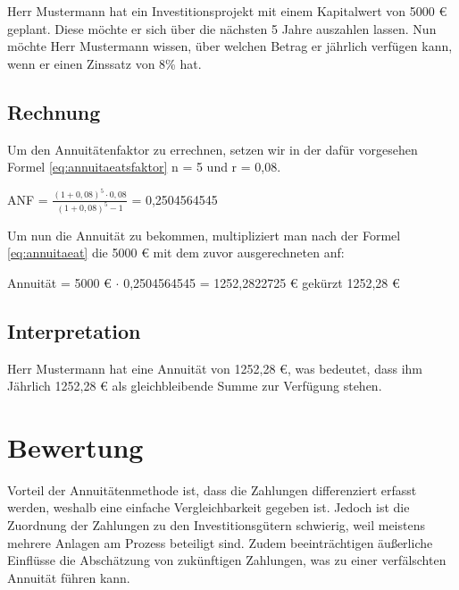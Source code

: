 Herr Mustermann hat ein Investitionsprojekt mit einem Kapitalwert von 5000 € geplant. Diese möchte er sich über die nächsten 5 Jahre auszahlen lassen. Nun möchte Herr Mustermann wissen, über welchen Betrag er jährlich verfügen kann, wenn er einen Zinssatz von 8\% hat.


\subsection{Rechnung}

Um den Annuitätenfaktor zu errechnen, setzen wir in der dafür vorgesehen Formel \eqref{eq:annuitaeatsfaktor} n = 5 und r = 0,08.

\bigskip

ANF = $\frac{ (1 + 0,08)^5 \cdot 0,08 }{ (1 + 0,08)^5 - 1 }$ = 0,2504564545

\bigskip

\noindent
Um nun die Annuität zu bekommen, multipliziert man nach der Formel \eqref{eq:annuitaeat} die 5000 € mit dem zuvor ausgerechneten \ac{anf}:

\bigskip

Annuität = 5000 € $\cdot$ 0,2504564545 = 1252,2822725 € gekürzt 1252,28 €

\subsection{Interpretation}

Herr Mustermann hat eine Annuität von 1252,28 €, was bedeutet, dass ihm Jährlich 1252,28 € als gleichbleibende Summe zur Verfügung stehen.

\section{Bewertung}

Vorteil der Annuitätenmethode ist, dass die Zahlungen differenziert erfasst werden, weshalb eine einfache Vergleichbarkeit gegeben ist. Jedoch ist die Zuordnung der Zahlungen zu den Investitionsgütern schwierig, weil meistens mehrere Anlagen am Prozess beteiligt sind. Zudem beeinträchtigen äußerliche Einflüsse die Abschätzung von zukünftigen Zahlungen, was zu einer verfälschten Annuität führen kann.
